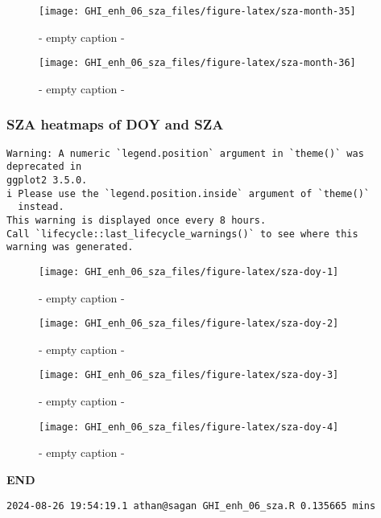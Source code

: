 \documentclass[
  10pt,
  a4paper,oneside]{article}
\begin{document}
\begin{figure}[H]

{\centering \texttt{[image: GHI\_enh\_06\_sza\_files/figure-latex/sza-month-35]} 

}

\caption{ - empty caption - }\label{fig:sza-month-35}
\end{figure}
\begin{figure}[H]

{\centering \texttt{[image: GHI\_enh\_06\_sza\_files/figure-latex/sza-month-36]} 

}

\caption{ - empty caption - }\label{fig:sza-month-36}
\end{figure}

\newpage
\FloatBarrier

\hypertarget{sza-heatmaps-of-doy-and-sza}{%
\subsubsection{SZA heatmaps of DOY and SZA}\label{sza-heatmaps-of-doy-and-sza}}

\begin{verbatim}
Warning: A numeric `legend.position` argument in `theme()` was deprecated in
ggplot2 3.5.0.
i Please use the `legend.position.inside` argument of `theme()`
  instead.
This warning is displayed once every 8 hours.
Call `lifecycle::last_lifecycle_warnings()` to see where this
warning was generated.
\end{verbatim}

\begin{figure}[H]

{\centering \texttt{[image: GHI\_enh\_06\_sza\_files/figure-latex/sza-doy-1]} 

}

\caption{ - empty caption - }\label{fig:sza-doy-1}
\end{figure}
\begin{figure}[H]

{\centering \texttt{[image: GHI\_enh\_06\_sza\_files/figure-latex/sza-doy-2]} 

}

\caption{ - empty caption - }\label{fig:sza-doy-2}
\end{figure}
\begin{figure}[H]

{\centering \texttt{[image: GHI\_enh\_06\_sza\_files/figure-latex/sza-doy-3]} 

}

\caption{ - empty caption - }\label{fig:sza-doy-3}
\end{figure}
\begin{figure}[H]

{\centering \texttt{[image: GHI\_enh\_06\_sza\_files/figure-latex/sza-doy-4]} 

}

\caption{ - empty caption - }\label{fig:sza-doy-4}
\end{figure}

\textbf{END}

\begin{verbatim}
2024-08-26 19:54:19.1 athan@sagan GHI_enh_06_sza.R 0.135665 mins
\end{verbatim}
\end{document}
